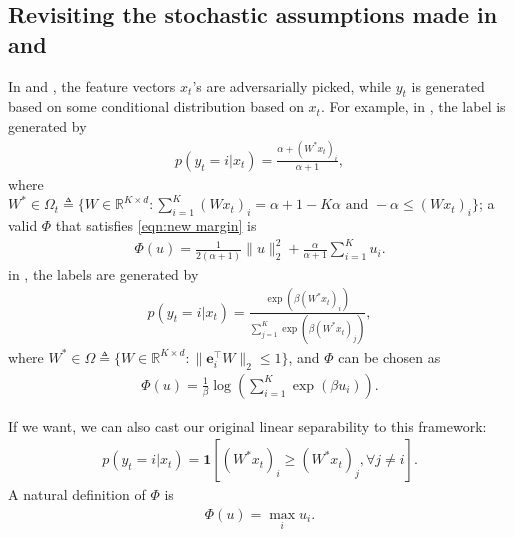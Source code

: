 \documentclass{article}
\newcommand{\one}{\boldsymbol{1}}
\newcommand{\e}{\mathbf{e}}
\begin{document}
\subsection{Revisiting the stochastic assumptions made in \cite{crammer2013multiclass} and \cite{agarwal2013selective}}
In \cite{crammer2013multiclass} and \cite{agarwal2013selective}, the feature vectors $x_t$'s are adversarially picked, while $y_t$ is generated based on some conditional distribution based on $x_t$. For example, in \cite{crammer2013multiclass}, the label is generated by
\begin{align}
    p(y_t = i | x_t) = \frac{\alpha + (W^*x_t)_i}{\alpha+1}, \label{eqn:confidit assumption}
\end{align}
where $W^* \in \Omega_t \triangleq \{W\in \mathbb{R}^{K\times d}: \sum_{i=1}^K (Wx_t)_i = \alpha+1-K\alpha \text{\ and\ } -\alpha \leq (Wx_t)_i\}$; a valid $\Phi$ that satisfies \eqref{eqn:new margin} is 
\begin{align}
    \Phi(u) = \frac{1}{2(\alpha+1)}\|u\|_2^2 + \frac{\alpha}{\alpha+1}\sum_{i=1}^K u_i. 
\end{align}
in \cite{agarwal2013selective}, the labels are generated by 
\begin{align}
    p(y_t = i | x_t) = \frac{\exp(\beta(W^*x_t)_i)}{\sum_{j=1}^K \exp(\beta(W^*x_t)_j) },
\end{align}
where $W^* \in \Omega \triangleq \{W\in \mathbb{R}^{K\times d}: \|\e_i^\top W\|_2 \leq 1 \}$, and $\Phi$ can be chosen as
\begin{align}
    \Phi(u) = \frac{1}{\beta}\log\left(\sum_{i=1}^K \exp(\beta u_i) \right). 
\end{align}

If we want, we can also cast our original linear separability to this framework: 
\begin{align}
    p(y_t=i|x_t) = \one\left[(W^*x_t)_i \geq (W^*x_t)_j, \forall j\neq i\right]. 
\end{align}
A natural definition of $\Phi$ is
\begin{align}
    \Phi(u) = \max_i u_i. 
\end{align}
\end{document}
